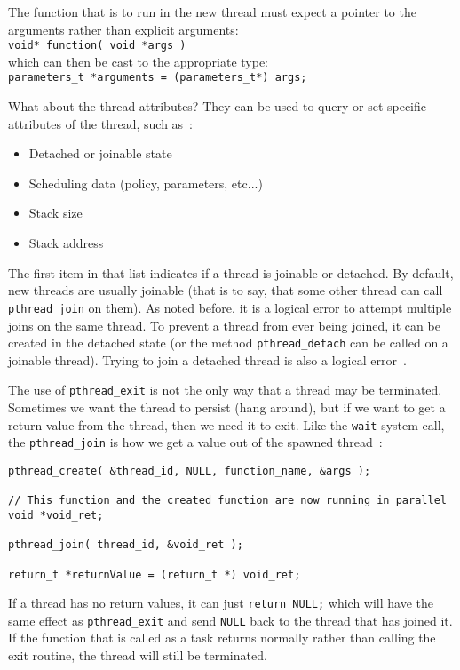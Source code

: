 The function that is to run in the new thread must expect a pointer to the arguments rather than explicit arguments:\\
\texttt{void* function( void *args )}\\
which can then be cast to the appropriate type:\\
\texttt{parameters\_t *arguments = (parameters\_t*) args;}


What about the thread attributes? They can be used to query or set specific attributes of the thread, such as~\cite{pthreads}:
\begin{itemize}
	\item Detached or joinable state
	\item Scheduling data (policy, parameters, etc...)
	\item Stack size
	\item Stack address
\end{itemize}

The first item in that list indicates if a thread is joinable or detached. By default, new threads are usually joinable (that is to say, that some other thread can call \texttt{pthread\_join} on them). As noted before, it is a logical error to attempt multiple joins on the same thread. To prevent a thread from ever being joined, it can be created in the detached state (or the method \texttt{pthread\_detach} can be called on a joinable thread). Trying to join a detached thread is also a logical error~\cite{pthreads}.

The use of \texttt{pthread\_exit} is not the only way that a thread may be terminated. Sometimes we want the thread to persist (hang around), but if we want to get a return value from the thread, then we need it to exit. Like the \texttt{wait} system call, the \texttt{pthread\_join} is how we get a value out of the spawned thread~\cite{mte241}:

\begin{verbatim}
pthread_create( &thread_id, NULL, function_name, &args );

// This function and the created function are now running in parallel 
void *void_ret;

pthread_join( thread_id, &void_ret );

return_t *returnValue = (return_t *) void_ret;
\end{verbatim}

If a thread has no return values, it can just \texttt{return NULL;} which will have the same effect as \texttt{pthread\_exit} and send \texttt{NULL} back to the thread that has joined it. If the function that is called as a task returns normally rather than calling the exit routine, the thread will still be terminated. 

